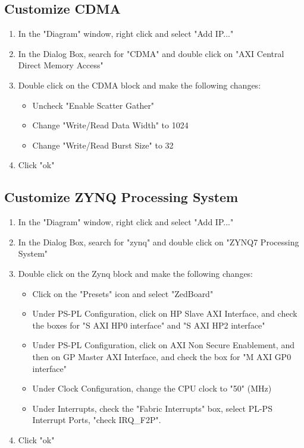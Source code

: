 \documentclass[12pt]{article}
\begin{document}
\subsection{Customize CDMA}
\begin{enumerate}
\item In the "Diagram" window, right click and select "Add IP..."
\item In the Dialog Box, search for "CDMA" and double click on "AXI Central Direct Memory Access"
\item Double click on the CDMA block and make the following changes:
\begin{itemize}
\item Uncheck "Enable Scatter Gather"
\item Change "Write/Read Data Width" to 1024
\item Change "Write/Read Burst Size" to 32
\end{itemize}
\item Click "ok"
\end{enumerate}

\subsection{Customize ZYNQ Processing System}
\begin{enumerate}
\item In the "Diagram" window, right click and select "Add IP..."
\item In the Dialog Box, search for "zynq" and double click on "ZYNQ7 Processing System"
\item Double click on the Zynq block and make the following changes:
\begin{itemize}
\item Click on the "Presets" icon and select "ZedBoard"
\item Under PS-PL Configuration, click on HP Slave AXI Interface, and check the boxes for "S AXI HP0 interface" and "S AXI HP2 interface"
\item Under PS-PL Configuration, click on AXI Non Secure Enablement, and then on GP Master AXI Interface, and check the box for "M AXI GP0 interface"
\item Under Clock Configuration, change the CPU clock to "50" (MHz)
\item Under Interrupts, check the "Fabric Interrupts" box, select PL-PS Interrupt Ports, "check IRQ\_F2P".
\end{itemize}
\item Click "ok"
\end{enumerate}
\end{document}
